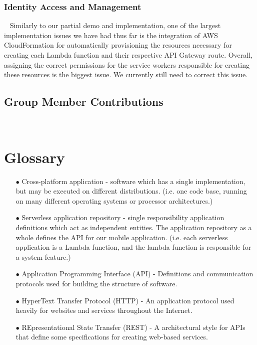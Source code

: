 \documentclass[10pt, a4paper]{article}
\begin{document}
\subsubsection{Identity Access and Management}
\par ~ Similarly to our partial demo and implementation, one of the largest implementation issues we have had thus far is the integration of AWS CloudFormation for automatically provisioning the resources necessary for creating each Lambda function and their respective API Gateway route. Overall, assigning the correct permissions for the service workers responsible for creating these resources is the biggest issue. We currently still need to correct this issue.

\subsection{Group Member Contributions}
\par ~ 


\section{Glossary}
\begin{enumerate}
	\item[$\bullet$] Cross-platform application - software which has a single implementation, but may be executed on different distributions. (i.e. one code base, running on many different operating systems or processor architectures.)
	\item[$\bullet$] Serverless application repository - single responsibility application definitions which act as independent entities. The application repository as a whole defines the API for our mobile application. (i.e. each serverless application is a Lambda function, and the lambda function is responsible for a system feature.)
	\item[$\bullet$] Application Programming Interface (API) - Definitions and communication protocols used for building the structure of software.
	\item[$\bullet$] HyperText Transfer Protocol (HTTP) - An application protocol used heavily for websites and services throughout the Internet.
	\item[$\bullet$] REpresentational State Transfer (REST) - A architectural style for APIs that define some specifications for creating web-based services.
\end{enumerate}
\end{document}
